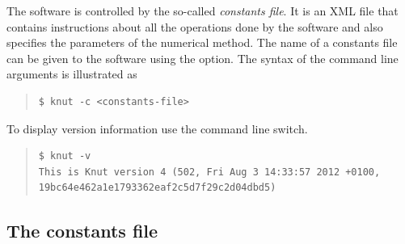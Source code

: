\documentclass[10pt,a4paper]{ddedoc}
\begin{document}
The software is controlled by the so-called \emph{constants file}. It is an XML file
that contains instructions about all the operations done by the software and
also specifies the parameters of the numerical method.
The name of a constants file can be given to the software using the  option.
The syntax of the command line arguments is illustrated as
{ \small \begin{quote} \begin{lstlisting}[basicstyle=\tt,frame=single]
$ knut -c <constants-file> 
\end{lstlisting} \end{quote} } \noindent
To display version information use the  command line switch.
{ \small \begin{quote} \begin{lstlisting}[basicstyle=\tt,frame=single]
$ knut -v
This is Knut version 4 (502, Fri Aug 3 14:33:57 2012 +0100, 19bc64e462a1e1793362eaf2c5d7f29c2d04dbd5)
\end{lstlisting} \end{quote} } \noindent


\subsection{The constants file}
\label{constfile}
\end{document}
